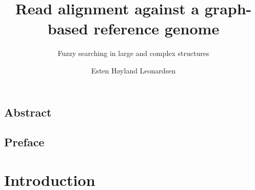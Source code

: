 \documentclass[UKenglish]{ifimaster}
\title{Read alignment against a graph-based reference genome}
\subtitle{Fuzzy searching in large and complex structures}
\author{Esten H{\o}yland Leonardsen}
\theoremstyle{break}
\begin{document}
\ififorside{}
\frontmatter{}
\maketitle{}

\chapter*{Abstract}                   

\tableofcontents{}
\listoffigures{}
\listoftables{}

\chapter*{Preface}                    

\mainmatter{}
\part{Introduction}                   



\backmatter{}
\printbibliography
\end{document}
